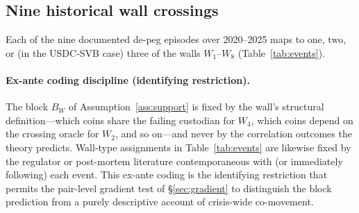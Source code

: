 \subsection{Nine historical wall crossings}\label{sec:ninewalls}
Each of the nine documented de-peg episodes over 2020--2025 maps to one, two, or (in the USDC-SVB case) three of the walls $W_1$--$W_8$ (Table~\ref{tab:events}).

\paragraph{Ex-ante coding discipline (identifying restriction).} The block $B_W$ of Assumption~\ref{ass:support} is fixed by the wall's structural definition---which coins share the failing custodian for $W_4$, which coins depend on the crossing oracle for $W_2$, and so on---and never by the correlation outcomes the theory predicts. Wall-type assignments in Table~\ref{tab:events} are likewise fixed by the regulator or post-mortem literature contemporaneous with (or immediately following) each event. This ex-ante coding is the identifying restriction that permits the pair-level gradient test of \S\ref{sec:gradient} to distinguish the block prediction from a purely descriptive account of crisis-wide co-movement.

